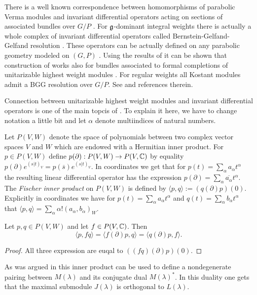 There is a well known correspondence between homomorphisms of parabolic Verma modules and invariant differential operators acting on sections of associated bundles over $G/P$ \cite{cap_bernstein-gelfand-gelfand_2001}. For $\mathfrak{g}$-dominant integral weights there is actually a whole complex of invariant differential operators called Bernstein-Gelfand-Gelfand resolution \cite{bernstein_differential_1975}.  These operators can be actually defined on any parabolic geometry modeled on $(G, P)$ \cite{cap_bernstein-gelfand-gelfand_2001, calderbank_differential_2001}. Using the results of \cite{huang_dirac_2006} it can be shown that construction of \cite{calderbank_differential_2001} works also for bundles associated to formal completions of unitarizable highest weight modules \cite{tucek_yamabe_2012}. For regular weights all Kostant modules admit a BGG resolution over $G/P$. See \cite{enright_diagrams_2014} and references therein. 

Connection between unitarizable highest weight modules and invariant differential operators is one of the main topcis of \cite{davidson_differential_1991}. To explain it here, we have to change notation a little bit and let $\alpha$ denote multiindices of natural numbers.

Let $P(V,W)$ denote the space of polynomials between two complex vector spaces $V$ and $W$ which are endowed with a Hermitian inner product. For $p\in P(V,W)$ define $p(\partial):P(V,W)\to P(V,\mathbb{C})$ by equality $p(\partial) e^{(s|t)_V} = p(\overline{s})e^{(s|t)_V}$. In coordinates we get that for $p(t) = \sum_{\alpha} a_{\alpha} t^{\alpha}$ the resulting linear differential operator has the expression $p(\partial)= \sum_{\alpha} \overline{a_{\alpha}} t^{\alpha}$. The \emph{Fischer inner product} on $P(V,W)$ is defined by $\langle p,q\rangle := (q(\partial)p)(0)$. Explicitly in coordinates we have for  $p(t) = \sum_{\alpha} a_{\alpha} t^{\alpha}$ and  $q(t) = \sum_{\alpha} b_{\alpha} t^{\alpha}$ that $\langle p,q\rangle = \sum_{\alpha} \alpha! (a_{\alpha},b_{\alpha})_W$.

\begin{lemma}
 Let $p,q\in P(V,W)$ and let $f\in P(V,\mathbb{C})$. Then
 \[
  \langle p,fq\rangle = \langle f(\partial)p, q \rangle = \langle q(\partial)p,f \rangle.
 \]
\end{lemma}
\begin{proof}
 All three expression are euqal to $((fq)(\partial)p)(0)$.
\end{proof}

As was argued in \cite{davidson_differential_1991} this inner product can be used to define a nondegenerate pairing between $M(\lambda)$ and its conjugate dual $M(\lambda)^*$. In this duality one gets that the maximal submodule $J(\lambda)$ is orthogonal to $L(\lambda)$.

